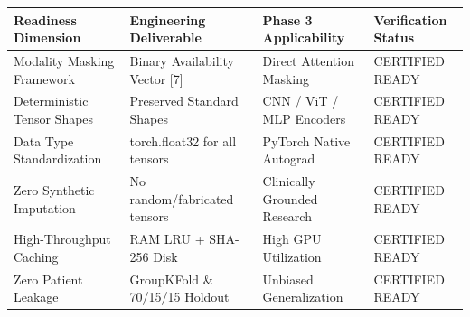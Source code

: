 \begin{tabular}{llll}
\toprule
Readiness Dimension & Engineering Deliverable & Phase 3 Applicability & Verification Status \\
\midrule
Modality Masking Framework & Binary Availability Vector [7] & Direct Attention Masking & CERTIFIED READY \\
Deterministic Tensor Shapes & Preserved Standard Shapes & CNN / ViT / MLP Encoders & CERTIFIED READY \\
Data Type Standardization & torch.float32 for all tensors & PyTorch Native Autograd & CERTIFIED READY \\
Zero Synthetic Imputation & No random/fabricated tensors & Clinically Grounded Research & CERTIFIED READY \\
High-Throughput Caching & RAM LRU + SHA-256 Disk & High GPU Utilization & CERTIFIED READY \\
Zero Patient Leakage & GroupKFold \& 70/15/15 Holdout & Unbiased Generalization & CERTIFIED READY \\
\bottomrule
\end{tabular}
